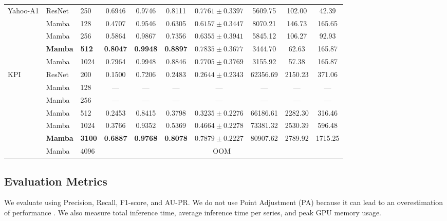 \documentclass[runningheads]{llncs}
\begin{document}
\begin{table}[H]
{\begin{tabular}{lllccccccc}
\multirow{5}{*}{Yahoo-A1}
 & ResNet & 250   & 0.6946 & 0.9746 & 0.8111 & $0.7761\pm0.3397$ &  5609.75 & 102.00 &  42.39 \\
 & Mamba  & 128   & 0.4707 & 0.9546 & 0.6305 & $0.6157\pm0.3447$ &  8070.21 & 146.73 & 165.65 \\
 & Mamba  & 256   & 0.5864 & 0.9867 & 0.7356 & $0.6355\pm0.3941$ &  5845.12 & 106.27 &  92.93 \\
 & \textbf{Mamba}  & \textbf{512}   & \textbf{0.8047} & \textbf{0.9948} & \textbf{0.8897} & $\mathbf{0.7835\pm0.3677}$ &  3444.70 &  62.63 & 165.87 \\
 & Mamba  & 1024  & 0.7964 & 0.9948 & 0.8846 & $0.7705\pm0.3769$ &  3155.92 &  57.38 & 165.87 \\
\midrule

\multirow{7}{*}{KPI}
 & ResNet & 200   & 0.1500 & 0.7206 & 0.2483 & $0.2644\pm0.2343$ & 62356.69 & 2150.23 &  371.06 \\
 & Mamba  & 128   & \textsf{---} & \textsf{---} & \textsf{---} & \textsf{---} & \textsf{---} & \textsf{---} & \textsf{---} \\
 & Mamba  & 256   & \textsf{---} & \textsf{---} & \textsf{---} & \textsf{---} & \textsf{---} & \textsf{---} & \textsf{---} \\
 & Mamba  & 512   & 0.2453 & 0.8415 & 0.3798 & $0.3235\pm0.2276$ & 66186.61 & 2282.30 &  316.46 \\
 & Mamba  & 1024  & 0.3766 & 0.9352 & 0.5369 & $0.4664\pm0.2278$ & 73381.32 & 2530.39 &  596.48 \\
 & \textbf{Mamba}  & \textbf{3100}  & \textbf{0.6887} & \textbf{0.9768} & \textbf{0.8078} & $\mathbf{0.7879\pm0.2227}$ & 80907.62 & 2789.92 & 1715.25 \\
 & Mamba  & 4096  & \multicolumn{7}{c}{\textsf{OOM}} \\

\bottomrule
\end{tabular}%
}
\end{table}

\subsection{Evaluation Metrics}

We evaluate using Precision, Recall, F1-score, and AU-PR. We do not use Point Adjustment (PA) because it can lead to an overestimation of performance \cite{kim2022towards}. We also measure total inference time, average inference time per series, and peak GPU memory usage.
\end{document}
